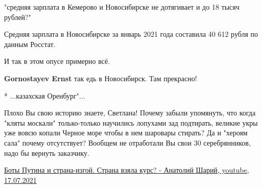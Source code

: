 \begin{itemize}
 

"средняя зарплата в Кемерово и Новосибирске не дотягивает и до 18 тысяч
рублей?"

Средняя зарплата в Новосибирске за январь 2021 года составила 40 612 рубля по
данным Росстат.

И так в этом опусе примерно всё.

\begin{itemize}
 
\textbf{Gornostayev Ernst} так едь в Новосибирск. Там прекрасно!
\end{itemize}

 
* ...казахская Оренбург"...
\Laughey[1.0][white]\Laughey[1.0][white]

 

Плохо Вы свою историю знаете, Светлана! Почему забыли упомянуть, что когда
"кляты москали" только-только научились лопухами зад подтирать, великие укры
уже вовсю копали Черное море чтобы в нем шаровары стирать? Да и "хероям сала"
почему отсутствует? Вообщем не отработали Вы свои 30 серебрянников, надо бы
вернуть заказчику.

 

\href{https://www.youtube.com/watch?v=RlH_kf_lUS8}{%
Боты Путина и страна-изгой. Страна взяла курс? - Анатолий Шарий, youtube, 17.07.2021}

 


\end{itemize}
